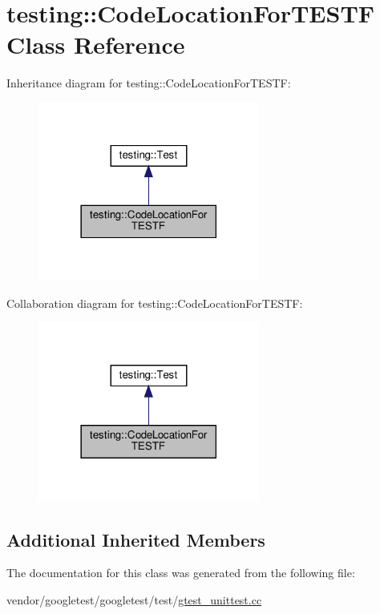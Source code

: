 \hypertarget{classtesting_1_1_code_location_for_t_e_s_t_f}{}\section{testing\+:\+:Code\+Location\+For\+T\+E\+S\+TF Class Reference}
\label{classtesting_1_1_code_location_for_t_e_s_t_f}


Inheritance diagram for testing\+:\+:Code\+Location\+For\+T\+E\+S\+TF\+:
\nopagebreak
\begin{figure}[H]
\begin{center}
\leavevmode
\includegraphics[width=206pt]{classtesting_1_1_code_location_for_t_e_s_t_f__inherit__graph}
\end{center}
\end{figure}


Collaboration diagram for testing\+:\+:Code\+Location\+For\+T\+E\+S\+TF\+:
\nopagebreak
\begin{figure}[H]
\begin{center}
\leavevmode
\includegraphics[width=206pt]{classtesting_1_1_code_location_for_t_e_s_t_f__coll__graph}
\end{center}
\end{figure}
\subsection*{Additional Inherited Members}


The documentation for this class was generated from the following file\+:\begin{DoxyCompactItemize}
\item 
vendor/googletest/googletest/test/\hyperlink{gtest__unittest_8cc}{gtest\+\_\+unittest.\+cc}\end{DoxyCompactItemize}
